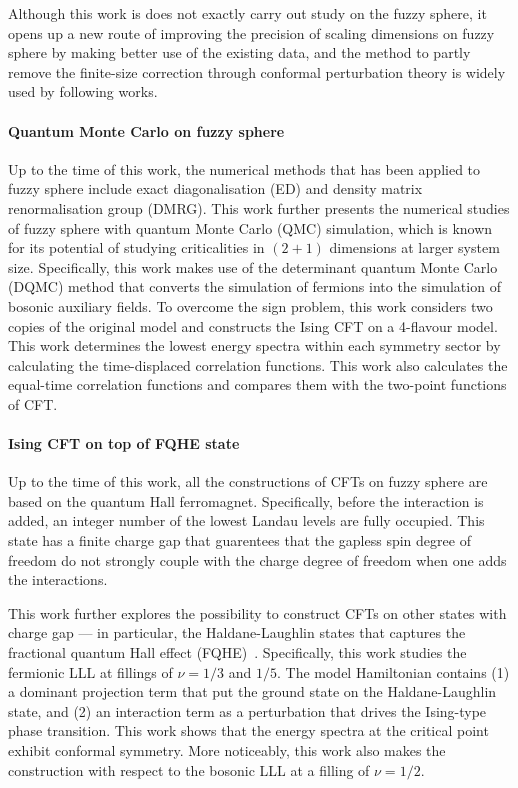 \documentclass{timesjhep}
\begin{document}
Although this work is does not exactly carry out study on the fuzzy sphere, it opens up a new route of improving the precision of scaling dimensions on fuzzy sphere by making better use of the existing data, and the method to partly remove the finite-size correction through conformal perturbation theory is widely used by following works. 

\paragraph{Quantum Monte Carlo on fuzzy sphere~\cite{Hofmann2023}}

Up to the time of this work, the numerical methods that has been applied to fuzzy sphere include exact diagonalisation (ED) and density matrix renormalisation group (DMRG). This work further presents the numerical studies of fuzzy sphere with quantum Monte Carlo (QMC) simulation, which is known for its potential of studying criticalities in $(2+1)$ dimensions at larger system size. Specifically, this work makes use of the determinant quantum Monte Carlo (DQMC) method that converts the simulation of fermions into the simulation of bosonic auxiliary fields. To overcome the sign problem, this work considers two copies of the original model and constructs the Ising CFT on a 4-flavour model. This work determines the lowest energy spectra within each symmetry sector by calculating the time-displaced correlation functions. This work also calculates the equal-time correlation functions and compares them with the two-point functions of CFT. 

\paragraph{Ising CFT on top of FQHE state~\cite{Voinea2024}}

Up to the time of this work, all the constructions of CFTs on fuzzy sphere are based on the quantum Hall ferromagnet. Specifically, before the interaction is added, an integer number of the lowest Landau levels are fully occupied. This state has a finite charge gap that guarentees that the gapless spin degree of freedom do not strongly couple with the charge degree of freedom when one adds the interactions. 

This work further explores the possibility to construct CFTs on other states with charge gap --- in particular, the Haldane-Laughlin states that captures the fractional quantum Hall effect (FQHE)~\cite{Haldane1983LLL,Laughlin1983FQHE}. Specifically, this work studies the fermionic LLL at fillings of $\nu=1/3$ and $1/5$. The model Hamiltonian contains (1) a dominant projection term that put the ground state on the Haldane-Laughlin state, and (2) an interaction term as a perturbation that drives the Ising-type phase transition. This work shows that the energy spectra at the critical point exhibit conformal symmetry. More noticeably, this work also makes the construction with respect to the bosonic LLL at a filling of $\nu=1/2$. 
\end{document}
